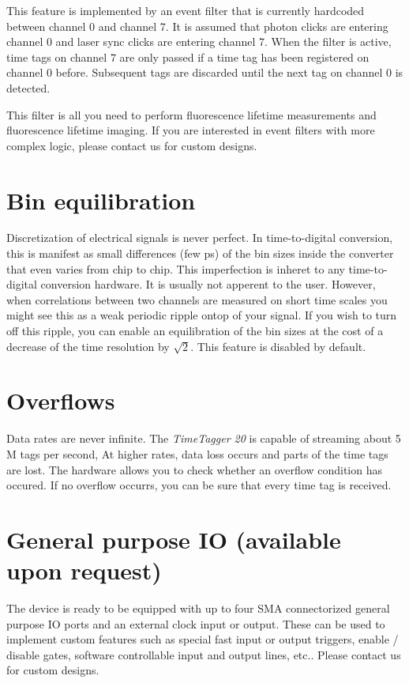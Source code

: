 \documentclass[letterpaper,10pt,english]{sphinxmanual}
\begin{document}
This feature is implemented by an event filter that is currently hardcoded between
channel 0 and channel 7. It is assumed that photon clicks are entering channel 0 and laser sync clicks
are entering channel 7. When the filter is active, time tags on channel 7 are only passed
if a time tag has been registered on channel 0 before. Subsequent tags are discarded until the next
tag on channel 0 is detected.

This filter is all you need to perform fluorescence lifetime measurements and fluorescence lifetime imaging.
If you are interested in event filters with more complex logic, please contact us for custom designs.


\section{Bin equilibration}
\label{sections/hardware:bin-equilibration}
Discretization of electrical signals is never perfect. In time-to-digital conversion, this is manifest
as small differences (few ps) of the bin sizes inside the converter that even varies from chip to chip.
This imperfection is inheret to any time-to-digital conversion hardware.
It is usually not apperent to the user. However, when correlations between two channels are measured on short
time scales you might see this as a weak periodic ripple ontop of your signal.
If you wish to turn off this ripple, you can enable an equilibration of the bin sizes
at the cost of a decrease of the time resolution by \(\sqrt{2}\). This feature is disabled by default.


\section{Overflows}
\label{sections/hardware:overflows}
Data rates are never infinite. The \emph{TimeTagger 20} is capable of streaming about 5 M tags per second,
At higher rates, data loss occurs and parts of the time tags are lost. The hardware allows you
to check whether an overflow condition has occured. If no overflow occurrs,
you can be sure that every time tag is received.


\section{General purpose IO (available upon request)}
\label{sections/hardware:general-purpose-io-available-upon-request}
The device is ready to be equipped with up to four SMA connectorized general purpose IO ports and an external clock input or output.
These can be used to implement custom features such as special fast input or output triggers, enable / disable gates,
software controllable input and output lines, etc.. Please contact us for custom designs.
\end{document}
